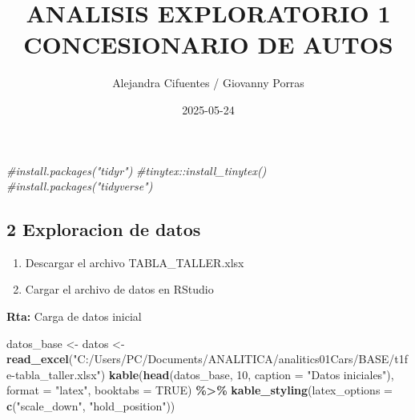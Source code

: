 \documentclass[
]{article}
\title{ANALISIS EXPLORATORIO 1 CONCESIONARIO DE AUTOS}
\author{Alejandra Cifuentes / Giovanny Porras}
\date{2025-05-24}
\newenvironment{Shaded}{\begin{snugshade}}{\end{snugshade}}
\newcommand{\AttributeTok}[1]{\textcolor[rgb]{0.13,0.29,0.53}{#1}}
\newcommand{\CommentTok}[1]{\textcolor[rgb]{0.56,0.35,0.01}{\textit{#1}}}
\newcommand{\ConstantTok}[1]{\textcolor[rgb]{0.56,0.35,0.01}{#1}}
\newcommand{\DecValTok}[1]{\textcolor[rgb]{0.00,0.00,0.81}{#1}}
\newcommand{\FunctionTok}[1]{\textcolor[rgb]{0.13,0.29,0.53}{\textbf{#1}}}
\newcommand{\NormalTok}[1]{#1}
\newcommand{\OtherTok}[1]{\textcolor[rgb]{0.56,0.35,0.01}{#1}}
\newcommand{\SpecialCharTok}[1]{\textcolor[rgb]{0.81,0.36,0.00}{\textbf{#1}}}
\newcommand{\StringTok}[1]{\textcolor[rgb]{0.31,0.60,0.02}{#1}}
\providecommand{\tightlist}{%
  \setlength{\itemsep}{0pt}\setlength{\parskip}{0pt}}
\begin{document}
\maketitle

{
\setcounter{tocdepth}{2}
\tableofcontents
}
\begin{Shaded}
\begin{Highlighting}[]
\CommentTok{\#install.packages("tidyr")}
\CommentTok{\#tinytex::install\_tinytex() }
\CommentTok{\#install.packages("tidyverse")}
\end{Highlighting}
\end{Shaded}

\subsection{2 Exploracion de datos}\label{exploracion-de-datos}

\begin{enumerate}
\def\labelenumi{\alph{enumi}.}
\tightlist
\item
  Descargar el archivo TABLA\_TALLER.xlsx
\item
  Cargar el archivo de datos en RStudio
\end{enumerate}

\textbf{Rta:} Carga de datos inicial

\begin{Shaded}
\begin{Highlighting}[]
\NormalTok{datos\_base }\OtherTok{\textless{}{-}}\NormalTok{ datos }\OtherTok{\textless{}{-}} \FunctionTok{read\_excel}\NormalTok{(}\StringTok{"C:/Users/PC/Documents/ANALITICA/analitics01Cars/BASE/t1fe{-}tabla\_taller.xlsx"}\NormalTok{)}
\FunctionTok{kable}\NormalTok{(}\FunctionTok{head}\NormalTok{(datos\_base, }\DecValTok{10}\NormalTok{,  }\AttributeTok{caption =} \StringTok{"Datos iniciales"}\NormalTok{), }\AttributeTok{format =} \StringTok{"latex"}\NormalTok{, }\AttributeTok{booktabs =} \ConstantTok{TRUE}\NormalTok{) }\SpecialCharTok{\%\textgreater{}\%} 
\FunctionTok{kable\_styling}\NormalTok{(}\AttributeTok{latex\_options =} \FunctionTok{c}\NormalTok{(}\StringTok{"scale\_down"}\NormalTok{, }\StringTok{"hold\_position"}\NormalTok{))}
\end{Highlighting}
\end{Shaded}
\end{document}
